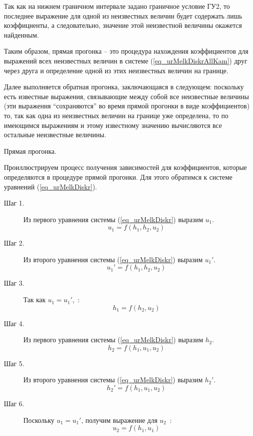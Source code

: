Так как на нижнем граничном интервале задано граничное условие ГУ2, то последнее выражение для одной из неизвестных величин будет содержать лишь коэффициенты, а следовательно, значение этой неизвестной величины окажется найденным.

Таким образом, прямая прогонка -- это процедура нахождения коэффициентов для выражений всех неизвестных величин в системе (\ref{eq_urMelkDiskrAllKam}) друг через друга и определение одной из этих неизвестных величин на границе.

Далее выполняется обратная прогонка, заключающаяся в следующем: поскольку есть известные выражения, связывающие между собой все неизвестные величины (эти выражения ``сохраняются'' во время прямой прогонки в виде коэффициентов) то, так как одна из неизвестных величин на границе уже определена, то по имеющимся выражениям и этому известному значению вычисляются все остальные неизвестные величины.

\vspace{0.5cm}

Прямая прогонка.

Проиллюстрируем процесс получения зависимостей для коэффициентов, которые определяются в процедуре прямой прогонки. Для этого обратимся к системе уравнений (\ref{eq_urMelkDiskr}).

\begin{description}

\item[Шаг 1.] Из первого уравнения системы (\ref{eq_urMelkDiskr}) выразим $u_1$.
$$
   u_1 = f(h_1, h_2, u_2)
$$

\item[Шаг 2.] Из второго уравнения системы (\ref{eq_urMelkDiskr}) выразим $u_1'$.
$$
   u_1' = f(h_1, h_2, u_2)
$$

\item[Шаг 3.] Так как $u_1 = u_1'$,\ :
$$
   h_1 = f(h_2, u_2)
$$

\item[Шаг 4.] Из первого уравнения системы (\ref{eq_urMelkDiskr}) выразим $h_2$.
$$
   h_2 = f(h_1, u_1, u_2)
$$

\item[Шаг 5.] Из второго уравнения системы (\ref{eq_urMelkDiskr}) выразим $h_2'$.
$$
   h_2' = f(h_1, u_1, u_2)
$$

\item[Шаг 6.] Поскольку $u_1 = u_1'$, получим выражение для $u_2$\ :
$$
   u_2 = f(h_1, u_1)
$$

\end{description}

